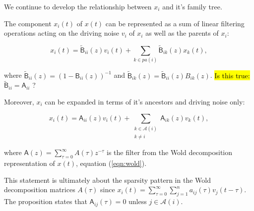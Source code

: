 \documentclass[12pt]{article}
\def\B{\mathsf{B}}  %
\def\wtB{\widetilde{\B}}  %
\def\A{\mathsf{A}}  %
\newcommand{\pa}[1]{pa(#1)}  %
\newcommand{\anc}[1]{\mathcal{A}(#1)}  %
\newcommand{\ancn}[2]{\mathcal{A}_{#1}(#2)}  %
\newcommand{\gpn}[2]{gp_{#1}(#2)}  %
\begin{document}
We continue to develop the relationship between $x_i$ and it's family tree.

\begin{proposition}
  \label{prop:parent_expanding}
  The component $x_i(t)$ of $x(t)$ can be represented as a sum of
  linear filtering operations acting on the driving noise $v_i$ of
  $x_i$ as well as the parents of $x_i$:

  \begin{equation}
    \label{eqn:parent_expansion}
    x_i(t) = \wtB_{ii}(z)v_i(t) + \sum_{k \in \pa{i}}\wtB_{ik}(z)x_k(t),
  \end{equation}

  where $\wtB_{ii}(z) = (1 - \B_{ii}(z))^{-1}$ and
  $\wtB_{ik}(z) = \wtB_{ii}(z) B_{ik}(z)$.  \hl{Is this true: }$\wtB_{ii} = \A_{ii}$ ?

  Moreover, $x_i$ can be expanded in terms of it's ancestors and
  driving noise only:

  \begin{equation}
    \label{eqn:ancestor_expansion}
    x_i(t) = \A_{ii}(z)v_i(t) + \sum_{\substack{k \in \anc{i} \\ k \ne i}}\A_{ik}(z)v_k(t),
  \end{equation}

  where $\A(z) = \sum_{\tau = 0}^\infty A(\tau)z^{-\tau}$ is the filter from
  the Wold decomposition representation of $x(t)$, equation
  (\ref{eqn:wold}).
\end{proposition}

This statement is ultimately about the sparsity pattern in the Wold
decomposition matrices $A(\tau)$ since
$x_i(t) = \sum_{\tau = 0}^\infty \sum_{j = 1}^n a_{ij}(\tau)v_j(t -
\tau)$.  The proposition states that $\A_{ij}(\tau) = 0$ unless
$j \in \anc{i}$.



\end{document}
